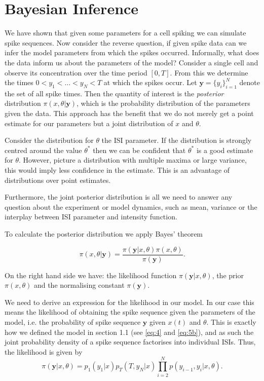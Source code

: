 \documentclass[../main.tex]{subfiles}
\begin{document}
\section{Bayesian Inference }
We have shown that given some parameters for a cell spiking we can simulate spike sequences. Now consider the reverse question, if given spike data can we infer the model parameters from which the spikes occurred. Informally, what does the data inform us about the parameters of the model? Consider a single cell and observe its  concentration over the time period $[0,T]$. From this we determine the times $0< y_1 < \dots < y_N < T$ at which the  spikes occur. Let $\mathbf{y} = \{y_i\}_{i=1}^N$ denote the set of all spike times. Then the quantity of interest is the {\it posterior } distribution $\pi (x,\theta | \mathbf{y})$, which is the probability distribution of the parameters given the data. This approach has the benefit that we do not merely get a point estimate for our parameters but a joint distribution of $x$ and $\theta$. 

Consider the distribution for $\theta$ the ISI parameter. If the distribution is strongly centred around the value $\theta^*$ then we can be confident that $\theta^*$ is a good estimate for $\theta$. However, picture a distribution with multiple maxima or large variance, this would imply less confidence in the estimate.  This is an advantage of distributions over point estimates. 

Furthermore, the  joint posterior distribution is all we need to answer any question about the experiment or model dynamics, such as mean, variance or the interplay between ISI parameter and intensity function.  
 
To calculate the posterior distribution we apply Bayes' theorem

\begin{equation}\label{eq:Bayes}
\pi (x, \theta |\mathbf{y}) = \frac{ \pi(\mathbf{y} | x, \theta)  \pi(x, \theta)}{ \pi(\mathbf{y})}.
\end{equation}

On the right hand side we have: the likelihood function $ \pi(\mathbf{y} | x,\theta)$, the prior $\pi(x, \theta)$ and the normalising constant  $\pi (\mathbf{y})$.

  We need to derive an expression for the likelihood in our model. In our case this means the likelihood of obtaining the spike sequence given the parameters of the model, i.e. the probability of spike sequence $\mathbf{y}$ given $x(t)$ and $\theta$. This is exactly how we defined the model in section 1.1 (see \eqref{eq:4} and \eqref{eq:5b}), and as such the joint probability density of a spike sequence factorises into individual ISIs. Thus, the likelihood is given by
\begin{equation} \label{eq:10}
\pi(\mathbf{y} |x, \theta) = p_1(y_1|x) p_T(T,y_N|x) \prod^N_{i=2} p(y_{i-1},y_i|x, \theta).
\end{equation} 
\end{document}
